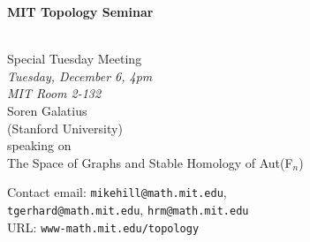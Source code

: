 \documentclass{slides}
\begin{document}
\begin{center}

{\fontsize {54pt}{40pt}\selectfont

\textrm{
{\textbf{MIT Topology Seminar}}}
}\\
\large{Special Tuesday Meeting}
\\
\vspace{1cm}
{\large\textrm{\emph{Tuesday, December 6, 4pm\\MIT Room 2-132}}}\\
\vspace{1cm}
\textrm{{\LARGE Soren Galatius  \\[.5cm](Stanford University)}}\\
\vspace{1cm} %
\textrm{speaking on}\\ %
\vspace{5mm}
\textrm{{\LARGE The Space of Graphs and Stable Homology of Aut(F$_n$)}}\\
\end{center}
\vspace{1cm}
{\tiny

\textrm{Contact email: } \texttt{mikehill@math.mit.edu},\\
 \texttt{tgerhard@math.mit.edu},
\texttt{hrm@math.mit.edu}\\
\textrm{URL: } \texttt{www-math.mit.edu/topology}
}
\end{document}
